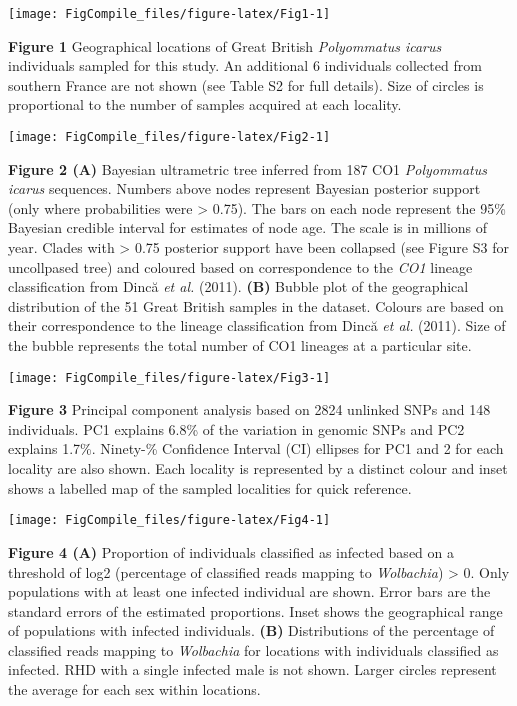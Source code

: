 \documentclass[12pt,]{article}
\title{}
\author{}
\date{}
\begin{document}
 \pagestyle{plain}

\begin{center}\texttt{[image: FigCompile\_files/figure-latex/Fig1-1]} \end{center}

\textbf{Figure 1} Geographical locations of Great British
\emph{Polyommatus icarus} individuals sampled for this study. An
additional 6 individuals collected from southern France are not shown
(see Table S2 for full details). Size of circles is proportional to the
number of samples acquired at each locality.

\texttt{[image: FigCompile\_files/figure-latex/Fig2-1]}

\textbf{Figure 2 (A)} Bayesian ultrametric tree inferred from 187 CO1
\emph{Polyommatus icarus} sequences. Numbers above nodes represent
Bayesian posterior support (only where probabilities were \textgreater{}
0.75). The bars on each node represent the 95\% Bayesian credible
interval for estimates of node age. The scale is in millions of year.
Clades with \textgreater{} 0.75 posterior support have been collapsed
(see Figure S3 for uncollpased tree) and coloured based on
correspondence to the \emph{CO1} lineage classification from Dincă
\emph{et al.} (2011). \textbf{(B)} Bubble plot of the geographical
distribution of the 51 Great British samples in the dataset. Colours are
based on their correspondence to the lineage classification from Dincă
\emph{et al.} (2011). Size of the bubble represents the total number of
CO1 lineages at a particular site.

\pagebreak

\texttt{[image: FigCompile\_files/figure-latex/Fig3-1]}

\textbf{Figure 3} Principal component analysis based on 2824 unlinked
SNPs and 148 individuals. PC1 explains 6.8\% of the variation in genomic
SNPs and PC2 explains 1.7\%. Ninety-\% Confidence Interval (CI) ellipses
for PC1 and 2 for each locality are also shown. Each locality is
represented by a distinct colour and inset shows a labelled map of the
sampled localities for quick reference.

\begin{center}\texttt{[image: FigCompile\_files/figure-latex/Fig4-1]} \end{center}

\textbf{Figure 4 (A)} Proportion of individuals classified as infected
based on a threshold of log2 (percentage of classified reads mapping to
\emph{Wolbachia}) \textgreater{} 0. Only populations with at least one
infected individual are shown. Error bars are the standard errors of the
estimated proportions. Inset shows the geographical range of populations
with infected individuals. \textbf{(B)} Distributions of the percentage
of classified reads mapping to \emph{Wolbachia} for locations with
individuals classified as infected. RHD with a single infected male is
not shown. Larger circles represent the average for each sex within
locations.
\end{document}
